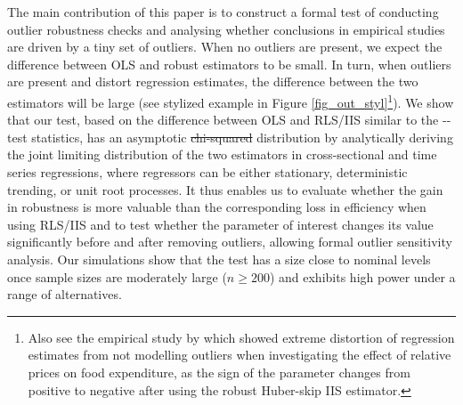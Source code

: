 \documentclass[11pt, letterpaper]{article}
\numberwithin{algorithm}{section}
\numberwithin{assumption}{section}
\numberwithin{lemma}{section}
\numberwithin{theorem}{section}
\numberwithin{corollary}{section}
\numberwithin{remark}{section}
\numberwithin{equation}{section}
\numberwithin{figure}{section}
\numberwithin{table}{section}
\providecommand{\DIFadd}[1]{{\protect\color{blue}\uwave{#1}}} %
\providecommand{\DIFdel}[1]{{\protect\color{red}\sout{#1}}}                      %
\providecommand{\DIFaddbegin}{} %
\providecommand{\DIFaddend}{} %
\providecommand{\DIFdelbegin}{} %
\providecommand{\DIFdelend}{} %
\newcommand{\DIFscaledelfig}{0.5}
\newlength{\DIFdelgraphicswidth} %
\newlength{\DIFdelgraphicsheight} %
\newcommand{\DIFaddincludegraphics}[2][]{{\color{blue}\fbox{\DIFOincludegraphics[#1]{#2}}}} %
\newcommand{\DIFdelincludegraphics}[2][]{%
\sbox{\DIFdelgraphicsbox}{\DIFOincludegraphics[#1]{#2}}%
\settoboxwidth{\DIFdelgraphicswidth}{\DIFdelgraphicsbox} %
\settoboxtotalheight{\DIFdelgraphicsheight}{\DIFdelgraphicsbox} %
\scalebox{\DIFscaledelfig}{%
\parbox[b]{\DIFdelgraphicswidth}{\usebox{\DIFdelgraphicsbox}\\[-\baselineskip] \rule{\DIFdelgraphicswidth}{0em}}\llap{\resizebox{\DIFdelgraphicswidth}{\DIFdelgraphicsheight}{%
\setlength{\unitlength}{\DIFdelgraphicswidth}%
\begin{picture}(1,1)%
\thicklines\linethickness{2pt} %
{\color[rgb]{1,0,0}\put(0,0){\framebox(1,1){}}}%
{\color[rgb]{1,0,0}\put(0,0){\line( 1,1){1}}}%
{\color[rgb]{1,0,0}\put(0,1){\line(1,-1){1}}}%
\end{picture}%
}\hspace*{3pt}}} %
} %
\DeclareRobustCommand{\DIFaddbegin}{\DIFOaddbegin \let\includegraphics\DIFaddincludegraphics} %
\DeclareRobustCommand{\DIFaddend}{\DIFOaddend \let\includegraphics\DIFOincludegraphics} %
\DeclareRobustCommand{\DIFdelbegin}{\DIFOdelbegin \let\includegraphics\DIFdelincludegraphics} %
\DeclareRobustCommand{\DIFdelend}{\DIFOaddend \let\includegraphics\DIFOincludegraphics} %
\begin{document}
The main contribution of this paper is to construct \DIFaddbegin \DIFadd{such }\DIFaddend a formal test of conducting outlier robustness checks and analysing whether \DIFaddbegin \DIFadd{or not }\DIFaddend conclusions in empirical studies are driven by a tiny set of outliers. When no outliers are present, we expect the difference between OLS and robust estimators to be small. In turn, when outliers are present and distort regression estimates, the difference between the two estimators will be large (see stylized example in Figure \ref{fig_out_styl}\footnote{Also see the empirical study by \cite{hendry2011econometric} which showed extreme distortion of regression estimates from not modelling outliers when investigating the effect of relative prices on food expenditure, as the sign of the parameter changes from positive to negative after using the robust Huber-skip IIS estimator.}). We show that our test, based on the difference between OLS and RLS/IIS similar to the \cite{durbin1954errors}-\cite{hausman1978specification}-\cite{wu1973alternative} test statistics, has an asymptotic \DIFdelbegin \DIFdel{chi-squared }\DIFdelend \DIFaddbegin \DIFadd{$\chi^2$ }\DIFaddend distribution by analytically deriving the joint limiting distribution of the two estimators in cross-sectional and time series regressions, where regressors can be either stationary, deterministic trending, or unit root processes. It thus enables us to evaluate whether the gain in robustness is more valuable than the corresponding loss in efficiency when using RLS/IIS and to test whether the parameter of interest changes its value significantly before and after removing outliers, allowing formal outlier sensitivity analysis. Our simulations show that the test has a size close to nominal levels once sample sizes are moderately large ($n \geq 200$) and exhibits high power under a range of alternatives.
\end{document}

